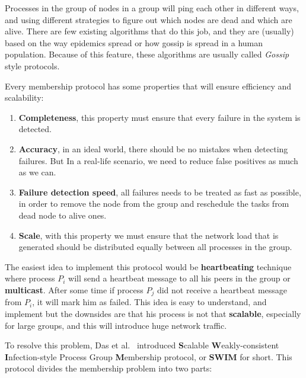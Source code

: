 Processes in the group of nodes in a group will ping each other in different ways, and using different strategies to figure out which nodes are dead and which are alive. There are few existing algorithms that do this job, and they are (usually) based on the way epidemics spread or how gossip is spread in a human population. Because of this feature, these algorithms are usually called \textit{Gossip} style protocols.

Every membership protocol has some properties that will ensure efficiency and scalability:

\begin{enumerate}[start=1,label={(\bfseries \arabic*)}] \label{ds:features}
	\item \textbf{Completeness}, this property must ensure that every failure in the system is detected.
	\item \textbf{Accuracy}, in an ideal world, there should be no mistakes when detecting failures. But In a real-life scenario, we need to reduce false positives as much as we can.
	\item \textbf{Failure detection speed}, all failures needs to be treated as fast as possible, in order to remove the node from the group and reschedule the tasks from dead node to alive ones.
	\item \textbf{Scale}, with this property we must ensure that the network load that is generated should be distributed equally between all processes in the group.
\end{enumerate}

The easiest idea to implement this protocol would be \textbf{heartbeating} technique where process $P_i$ will send a heartbeat message to all his peers in the group or \textbf{multicast}. After some time if process $P_j$ did not receive a heartbeat message from $P_i$, it will mark him as failed. This idea is easy to understand, and implement but the downsides are that his process is not that \textbf{scalable}, especially for large groups, and this will introduce huge network traffic.

To resolve this problem, Das et al.~\cite{DasGM02} introduced \textbf{S}calable \textbf{W}eakly-consistent \textbf{I}nfection-style Process Group \textbf{M}embership protocol, or \textbf{SWIM} for short\label{swim}. This protocol divides the membership problem into two parts:

